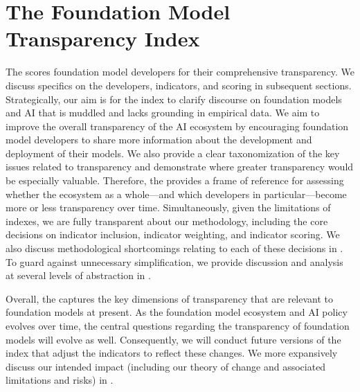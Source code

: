 \hypertarget{fmti}{\section{The Foundation Model Transparency Index}}
\label{sec:fmti}
The \projectname scores foundation model developers for their comprehensive transparency. 
We discuss specifics on the developers, indicators, and scoring in subsequent sections.
Strategically, our aim is for the index to clarify discourse on foundation models and AI that is muddled and lacks grounding in empirical data. 
We aim to improve the overall transparency of the AI ecosystem by encouraging foundation model developers to share more information about the development and deployment of their models. 
We also provide a clear taxonomization of the key issues related to transparency and demonstrate where greater transparency would be especially valuable. 
Therefore, the \projectname provides a frame of reference for assessing whether the ecosystem as a whole---and which developers in particular---become more or less transparency over time.
Simultaneously, given the limitations of indexes, we are fully transparent about our methodology, including the core decisions on indicator inclusion, indicator weighting, and indicator scoring.
We also discuss methodological shortcomings relating to each of these decisions in .
To guard against unnecessary simplification, we provide discussion and analysis at several levels of abstraction in . 

Overall, the \projectname captures the key dimensions of transparency that are relevant to foundation models at present.
As the foundation model ecosystem and AI policy evolves over time, the central questions regarding the transparency of foundation models will evolve as well.
Consequently, we will conduct future versions of the index that adjust the indicators to reflect these changes.
We more expansively discuss our intended impact (including our theory of change and associated limitations and risks) in .